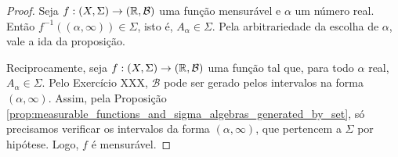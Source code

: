\begin{proof}
    Seja $f:(X,\Sigma)\rightarrow (\mathbb{R},\mathcal{B})$ uma função mensurável e $\alpha$ um número real. Então $f^{-1}((\alpha, \infty))\in \Sigma$, isto é, $A_{\alpha}\in \Sigma$. Pela arbitrariedade da escolha de $\alpha$, vale a ida da proposição.

    Reciprocamente, seja $f:(X,\Sigma)\rightarrow (\mathbb{R},\mathcal{B})$ uma função tal que, para todo $\alpha$ real, $A_{\alpha} \in \Sigma$. Pelo Exercício XXX, $\mathcal{B}$ pode ser gerado pelos intervalos na forma $(\alpha,\infty)$. Assim, pela Proposição \ref{prop:measurable_functions_and_sigma_algebras_generated_by_set}, só precisamos verificar os intervalos da forma $(\alpha,\infty)$, que pertencem a $\Sigma$  por hipótese. Logo, $f$ é mensurável.
\end{proof}